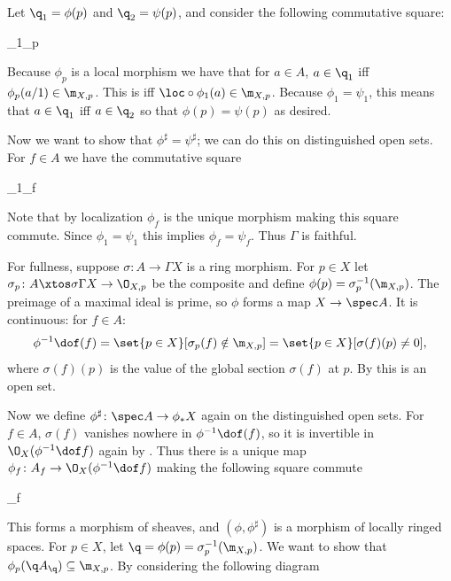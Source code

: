     Let $\q_1=\phi(p)$ and $\q_2=\psi(p)$, and consider the following commutative square:

        {\phi_1}{\phi_p}{}\loc

    Because $\phi_p$ is a local morphism we have that for $a\in A$, $a\in\q_1$ iff $\phi_p(a/1)\in\m_{X,p}$.
    This is iff $\loc\circ\phi_1(a)\in\m_{X,p}$.
    Because $\phi_1=\psi_1$, this means that $a\in\q_1$ iff $a\in\q_2$ so that $\phi(p)=\psi(p)$ as desired.

    Now we want to show that $\phi^\sharp=\psi^\sharp$; we can do this on distinguished open sets.
    For $f\in A$ we have the commutative square

        {\phi_1}{\phi_f}{}{}

    Note that by localization $\phi_f$ is the unique morphism making this square commute.
    Since $\phi_1=\psi_1$ this implies $\phi_f=\psi_f$.
    Thus $\Gamma$ is faithful.

    For fullness, suppose $\sigma\colon A\to\Gamma X$ is a ring morphism.
    For $p\in X$ let $\sigma_p\colon A\xtos\sigma\Gamma X\to\O_{X,p}$ be the composite and define
    $\phi(p)=\sigma_p^{-1}(\m_{X,p})$.
    The preimage of a maximal ideal is prime, so $\phi$ forms a map $X\to\spec A$.
    It is continuous: for $f\in A$:
    $$ \phi^{-1}\dof(f) = \set{p\in X}[\sigma_p(f)\notin\m_{X,p}] = \set{p\in X}[\sigma(f)(p)\neq0] , $$
    where $\sigma(f)(p)$ is the value of the global section $\sigma(f)$ at $p$.
    By  this is an open set.

    Now we define $\phi^\sharp\colon\spec A\to\phi_*X$ again on the distinguished open sets.
    For $f\in A$, $\sigma(f)$ vanishes nowhere in $\phi^{-1}\dof(f)$, so it is invertible in $\O_X(\phi^{-1}\dof f)$ again by
    .
    Thus there is a unique map $\phi_f\colon A_f\to\O_X(\phi^{-1}\dof f)$ making the following square commute

        {\sigma}{\phi_f}{}{}

    This forms a morphism of sheaves, and $(\phi,\phi^\sharp)$ is a morphism of locally ringed spaces.
    For $p\in X$, let $\q=\phi(p)=\sigma_p^{-1}(\m_{X,p})$.
    We want to show that $\phi_p(\q A_\q)\subseteq\m_{X,p}$.
    By considering the following diagram

    \vfill\break

